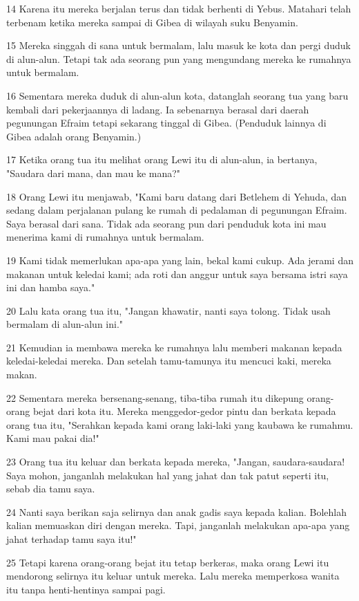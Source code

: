 \par 14 Karena itu mereka berjalan terus dan tidak berhenti di Yebus. Matahari telah terbenam ketika mereka sampai di Gibea di wilayah suku Benyamin.
\par 15 Mereka singgah di sana untuk bermalam, lalu masuk ke kota dan pergi duduk di alun-alun. Tetapi tak ada seorang pun yang mengundang mereka ke rumahnya untuk bermalam.
\par 16 Sementara mereka duduk di alun-alun kota, datanglah seorang tua yang baru kembali dari pekerjaannya di ladang. Ia sebenarnya berasal dari daerah pegunungan Efraim tetapi sekarang tinggal di Gibea. (Penduduk lainnya di Gibea adalah orang Benyamin.)
\par 17 Ketika orang tua itu melihat orang Lewi itu di alun-alun, ia bertanya, "Saudara dari mana, dan mau ke mana?"
\par 18 Orang Lewi itu menjawab, "Kami baru datang dari Betlehem di Yehuda, dan sedang dalam perjalanan pulang ke rumah di pedalaman di pegunungan Efraim. Saya berasal dari sana. Tidak ada seorang pun dari penduduk kota ini mau menerima kami di rumahnya untuk bermalam.
\par 19 Kami tidak memerlukan apa-apa yang lain, bekal kami cukup. Ada jerami dan makanan untuk keledai kami; ada roti dan anggur untuk saya bersama istri saya ini dan hamba saya."
\par 20 Lalu kata orang tua itu, "Jangan khawatir, nanti saya tolong. Tidak usah bermalam di alun-alun ini."
\par 21 Kemudian ia membawa mereka ke rumahnya lalu memberi makanan kepada keledai-keledai mereka. Dan setelah tamu-tamunya itu mencuci kaki, mereka makan.
\par 22 Sementara mereka bersenang-senang, tiba-tiba rumah itu dikepung orang-orang bejat dari kota itu. Mereka menggedor-gedor pintu dan berkata kepada orang tua itu, "Serahkan kepada kami orang laki-laki yang kaubawa ke rumahmu. Kami mau pakai dia!"
\par 23 Orang tua itu keluar dan berkata kepada mereka, "Jangan, saudara-saudara! Saya mohon, janganlah melakukan hal yang jahat dan tak patut seperti itu, sebab dia tamu saya.
\par 24 Nanti saya berikan saja selirnya dan anak gadis saya kepada kalian. Bolehlah kalian memuaskan diri dengan mereka. Tapi, janganlah melakukan apa-apa yang jahat terhadap tamu saya itu!"
\par 25 Tetapi karena orang-orang bejat itu tetap berkeras, maka orang Lewi itu mendorong selirnya itu keluar untuk mereka. Lalu mereka memperkosa wanita itu tanpa henti-hentinya sampai pagi.
